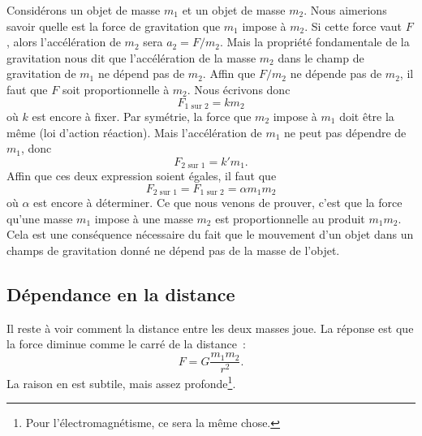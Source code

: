 Considérons un objet de masse $m_1$ et un objet de masse $m_2$. Nous aimerions savoir quelle est la force de gravitation que $m_1$ impose à $m_2$. Si cette force vaut $F$, alors l'accélération de $m_2$ sera $a_2=F/m_2$. Mais la propriété fondamentale de la gravitation nous dit que l'accélération de la masse $m_2$ dans le champ de gravitation de $m_1$ ne dépend pas de $m_2$. Affin que $F/m_2$ ne dépende pas de $m_2$, il faut que $F$ soit proportionnelle à $m_2$. Nous écrivons donc
\begin{equation}
	F_{\text{1 sur 2}}=k m_2
\end{equation}
où $k$ est encore à fixer. Par symétrie, la force que $m_2$ impose à $m_1$ doit être la même (loi d'action réaction). Mais l'accélération de $m_1$ ne peut pas dépendre de $m_1$, donc
\begin{equation}
	F_{\text{2 sur 1}}=k' m_1.
\end{equation}
Affin que ces deux expression soient égales, il faut que
\begin{equation}
	F_{\text{2 sur 1}}=F_{\text{1 sur 2}}=\alpha m_1 m_2
\end{equation}
où $\alpha$ est encore à déterminer. Ce que nous venons de prouver, c'est que la force qu'une masse $m_1$ impose à une masse $m_2$ est proportionnelle au produit $m_1m_2$. Cela est une conséquence nécessaire du fait que le mouvement d'un objet dans un champs de gravitation donné ne dépend pas de la masse de l'objet.

\subsection{Dépendance en la distance}


Il reste à voir comment la distance entre les deux masses joue. La réponse est que la force diminue comme le carré de la distance~:
\begin{equation}	\label{PgForceGrav}
	F=G\frac{ m_1m_2 }{ r^2 }.
\end{equation}
La raison en est subtile, mais assez profonde\footnote{Pour l'électromagnétisme, ce sera la même chose.}. 


